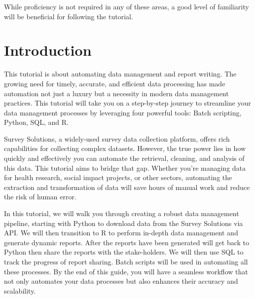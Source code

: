 \documentclass[
  letterpaper,
  DIV=11,
  numbers=noendperiod]{scrreprt}
\begin{document}
\begin{tcolorbox}[enhanced jigsaw, coltitle=black, colback=white, opacitybacktitle=0.6, bottomtitle=1mm, breakable, opacityback=0, colbacktitle=quarto-callout-note-color!10!white, title=\textcolor{quarto-callout-note-color}{\faInfo}\hspace{0.5em}{Note}, rightrule=.15mm, colframe=quarto-callout-note-color-frame, toptitle=1mm, titlerule=0mm, left=2mm, toprule=.15mm, arc=.35mm, bottomrule=.15mm, leftrule=.75mm]

While proficiency is not required in any of these areas, a good level of
familiarity will be beneficial for following the tutorial.

\end{tcolorbox}


\chapter{Introduction}\label{introduction}

This tutorial is about automating data management and report writing.
The growing need for timely, accurate, and efficient data processing has
made automation not just a luxury but a necessity in modern data
management practices. This tutorial will take you on a step-by-step
journey to streamline your data management processes by leveraging four
powerful tools: Batch scripting, Python, SQL, and R.

Survey Solutions, a widely-used survey data collection platform, offers
rich capabilities for collecting complex datasets. However, the true
power lies in how quickly and effectively you can automate the
retrieval, cleaning, and analysis of this data. This tutorial aims to
bridge that gap. Whether you're managing data for health research,
social impact projects, or other sectors, automating the extraction and
transformation of data will save hours of manual work and reduce the
risk of human error.

In this tutorial, we will walk you through creating a robust data
management pipeline, starting with Python to download data from the
Survey Solutions via API. We will then transition to R to perform
in-depth data management and generate dynamic reports. After the reports
have been generated will get back to Python then share the reports with
the stake-holders. We will then use SQL to track the progress of report
sharing. Batch scripts will be used in automating all these processes.
By the end of this guide, you will have a seamless workflow that not
only automates your data processes but also enhances their accuracy and
scalability.
\end{document}
